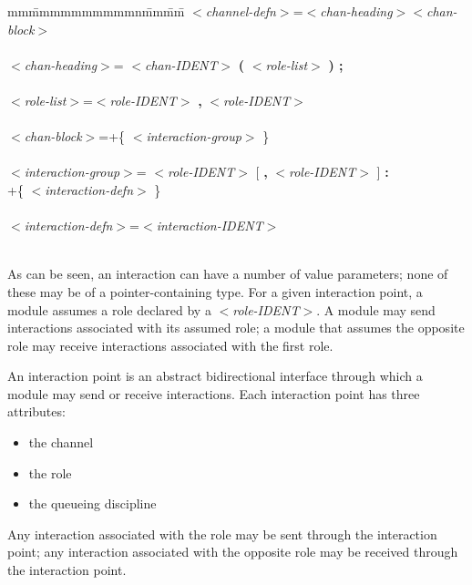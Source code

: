 \begin{tabbing}
mm\=mmmmmmmmmmn\=mm\=mm\=\+\kill
$<${\em channel-defn}$>$\>=\>$<${\em chan-heading}$><${\em chan-block}$>$\\
\mbox{}\\
$<${\em chan-heading}$>$\>= $<${\em chan-IDENT}$>$ {\bf (} $<${\em role-list}$>$
{\bf ) ;}\\
\mbox{}\\
$<${\em role-list}$>$\>=\>$<${\em role-IDENT}$>$ {\bf ,} $<${\em role-IDENT}$>$\\
\mbox{}\\
$<${\em chan-block}$>$\>=\>+\{ $<${\em interaction-group}$>$ \}\\
\mbox{}\\
$<${\em interaction-group}$>$\>= $<${\em role-IDENT}$>$ [ {\bf ,} $<${\em role-IDENT}$>$ ] {\bf
:}\\
\>\>\>+\{ $<${\em interaction-defn}$>$ \}\\
\mbox{}\\
$<${\em interaction-defn}$>$\>=\>$<${\em interaction-IDENT}$>$\\
\>\>\\
\end{tabbing}

As can be seen, an interaction can have a number of value
parameters; none of these may be of a pointer-containing
type. For a given interaction point, a module assumes a
role declared by a $<${\em role-IDENT}$>$. A module may send
interactions associated with its assumed role; a module that
assumes the opposite role may receive interactions
associated with the first role.
 
An interaction point is an abstract bidirectional
interface through which a module may send or receive
interactions. Each interaction point has three attributes:

\begin{itemize}
\item the channel
\item the role
\item the queueing discipline
\end{itemize}

Any interaction associated with the role may be sent
through the interaction point; any interaction associated
with the opposite role may be received through the
interaction point.
 
